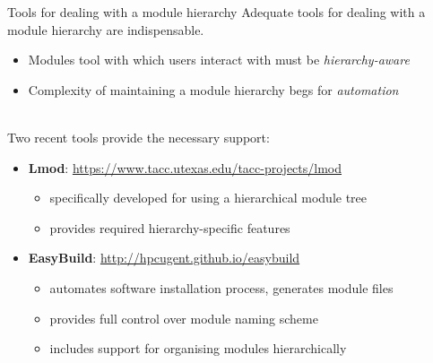 \documentclass[10pt,xcolor={usenames,dvipsnames}]{beamer}
\begin{document}

\begin{frame}{Tools for dealing with a module hierarchy}
    Adequate tools for dealing with a module hierarchy are indispensable.
    \begin{itemize}
        \item
            Modules tool with which users interact with must be \textit{hierarchy-aware}
        \item
            Complexity of maintaining a module hierarchy begs for \textit{automation}
    \end{itemize}~\\

    Two recent tools provide the necessary support:
    \begin{itemize}    
    \item
        \textbf{Lmod}: \url{https://www.tacc.utexas.edu/tacc-projects/lmod}
        \begin{itemize}
            \item specifically developed for using a hierarchical module tree
            \item provides required hierarchy-specific features
        \end{itemize}
    \item
        \textbf{EasyBuild}: \url{http://hpcugent.github.io/easybuild}
        \begin{itemize}
            \item automates software installation process, generates module files
            \item provides full control over module naming scheme
            \item includes support for organising modules hierarchically
        \end{itemize}
    \end{itemize}
\end{frame}

\end{document}
